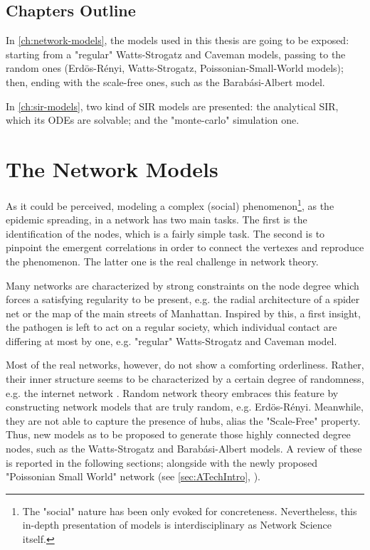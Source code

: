 \documentclass[a4paper,12pt,twoside]{book} %
\theoremstyle{definition}
\begin{document}
\section{Chapters Outline}
In \autoref{ch:network-models}, the models used in this thesis are going to be exposed: starting from a "regular" Watts-Strogatz and Caveman models, passing to the random ones (Erdös-Rényi, Watts-Strogatz, Poissonian-Small-World models); then, ending with the scale-free ones, such as the Barabási-Albert model. 

In \autoref{ch:sir-models}, two kind of SIR models are presented: the analytical SIR, which its ODEs are solvable; and the "monte-carlo" simulation one.

\chapter{The Network Models}
\label{ch:network-models}
As it could be perceived, modeling a complex (social) phenomenon\footnote{The "social" nature has been only evoked for concreteness. Nevertheless, this in-depth presentation of models is interdisciplinary as Network Science itself.}, as the epidemic spreading, in a network has two main tasks. The first is the identification of the nodes, which is a fairly simple task. The second is to pinpoint the emergent correlations in order to connect the vertexes and reproduce the phenomenon. The latter one is the real challenge in network theory.

Many networks are characterized by strong constraints on the node degree which forces a satisfying regularity to be present, e.g. the radial architecture of a spider net or the map of the main streets of Manhattan.
Inspired by this, a first insight, the pathogen is left to act on a regular society, which individual contact are differing at most by one, e.g. "regular" Watts-Strogatz and Caveman model.

Most of the real networks, however, do not show a comforting orderliness. 
Rather, their inner structure seems to be characterized by a certain degree of randomness, e.g. the internet network \cite{barabasi::2016networkbook}. Random network theory embraces this feature by constructing network models that are truly random, e.g. Erdös-Rényi. Meanwhile, they are not able to capture the presence of hubs, alias the "Scale-Free" property. Thus, new models as to be proposed to generate those highly connected degree nodes, such as the Watts-Strogatz and Barabási-Albert models.
A review of these is reported in the following sections; alongside with the newly proposed "Poissonian Small World" network (see \autoref{sec:ATechIntro}, \cite{Thurner::NetBasedExpl}).
\end{document}
